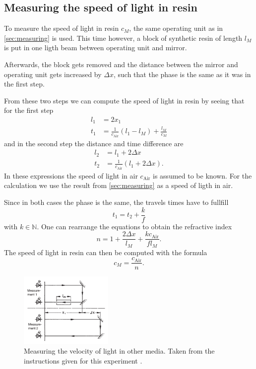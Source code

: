 \subsection{Measuring the speed of light in resin}
\label{sec:MeasuringResin}
To measure the speed of light in resin $c_M$, the same operating unit as in \autoref{sec:measuring} is
used. This time however, a block of synthetic resin of length $l_M$ is put in one ligth beam between
operating unit and mirror.

Afterwards, the block gets removed and the distance between the mirror and operating unit gets
increased by $\Delta x$, such that the phase is the same as it was in the first step.

From these two steps we can compute the speed of light in resin by seeing that for the first step
\begin{align}
  l_1 &= 2 x_1 \\
  t_1 &= \frac{1}{c_\text{Air}} (l_1 - l_M) + \frac{l_M}{c_M}
\end{align}
and in the second step the distance and time difference are
\begin{align}
  l_2 &= l_1 + 2\Delta x \\
  t_2 &= \frac{1}{c_\text{Air}} (l_1 + 2 \Delta x).
\end{align}
In these expressions the speed of light in air $c_\text{Air}$ is assumed to be known. For the calculation
we
use the result from \autoref{sec:measuring} as a speed of ligth in air.

Since in both cases the phase is the same, the travels times have to fullfill 
\[
  t_1 = t_2 + \frac{k}{f}
\]
with $k\in\mathbb{N}$. One can rearrange the equations to obtain the refractive index
\begin{equation}
  n = 1 + \frac{2 \Delta x}{l_M} + \frac{k c_\text{Air}}{f l_M}.
\end{equation}
The speed of light in resin can then be computed with the formula
\begin{equation}
  c_M = \frac{c_\text{Air}}{n}.
\end{equation}

\begin{figure}
    \centering
    \includegraphics[width=0.4\textwidth]{media/Setup Resin.png}
    \caption{Measuring the velocity of light in other media. Taken
      from the instructions given for this experiment \cite{LabInstructions}.}
    \label{fig:SetupResin}
\end{figure}

